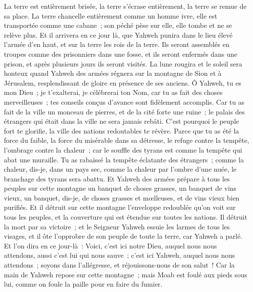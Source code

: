 \begin{multicols}{2}
La terre est entièrement brisée, la terre s'écrase entièrement, la terre se remue de sa place.
La terre chancelle entièrement comme un homme ivre, elle est transportée comme une cabane~; son péché pèse sur elle, elle tombe et ne se relève plus.
Et il arrivera en ce jour là, que Yahweh punira dans le lieu élevé l'armée d'en haut, et sur la terre les rois de la terre.
Ils seront assemblés en troupes comme des prisonniers dans une fosse, et ils seront enfermés dans une prison, et après plusieurs jours ils seront visités.
La lune rougira et le soleil sera honteux quand Yahweh des armées régnera sur la montagne de Sion et à Jérusalem, resplendissant de gloire en présence de ses anciens.
\VerseOne{}Ô Yahweh, tu es mon Dieu~; je t'exalterai, je célébrerai ton Nom, car tu as fait des choses merveilleuses~; tes conseils conçus d'avance sont fidèlement accomplis.
Car tu as fait de la ville un monceau de pierres, et de la cité forte une ruine~; le palais des étrangers qui était dans la ville ne sera jamais rebâti.
C'est pourquoi le peuple fort te glorifie, la ville des nations redoutables te révère.
Parce que tu as été la force du faible, la force du misérable dans sa détresse, le refuge contre la tempête, l'ombrage contre la chaleur~; car le souffle des tyrans est comme la tempête qui abat une muraille.
Tu as rabaissé la tempête éclatante des étrangers~; comme la chaleur, dis-je, dans un pays sec, comme la chaleur par l'ombre d'une nuée, le branchage des tyrans sera abattu.
Et Yahweh des armées prépare à tous les peuples sur cette montagne un banquet de choses grasses, un banquet de vins vieux, un banquet, dis-je, de choses grasses et mœlleuses, et de vins vieux bien purifiés.
Et il détruit sur cette montagne l'enveloppe redoublée qu'on voit sur tous les peuples, et la couverture qui est étendue sur toutes les nations.
Il détruit la mort par sa victoire~; et le Seigneur Yahweh essuie les larmes de tous les visages, et il ôte l'opprobre de son peuple de toute la terre, car Yahweh a parlé.
Et l'on dira en ce jour-là~: Voici, c'est ici notre Dieu, auquel nous nous attendons, aussi c'est lui qui nous sauve~; c'est ici Yahweh, auquel nous nous attendons~; soyons dans l'allégresse, et réjouissons-nous de son salut~!
Car la main de Yahweh repose sur cette montagne~; mais Moab est foulé aux pieds sous lui, comme on foule la paille pour en faire du fumier.

\end{multicols}
